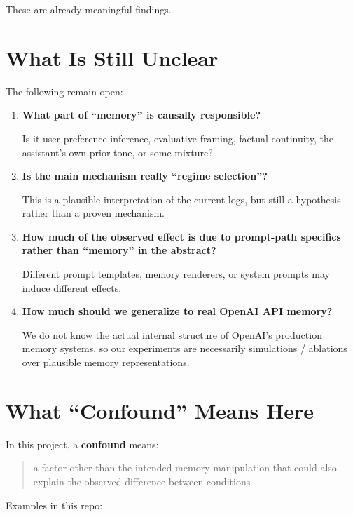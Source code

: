 \documentclass[11pt]{article}
\begin{document}
These are already meaningful findings.

\section{What Is Still Unclear}

The following remain open:

\begin{enumerate}
  \item \textbf{What part of ``memory'' is causally responsible?}

  Is it user preference inference, evaluative framing, factual continuity, the assistant's own prior tone, or some mixture?

  \item \textbf{Is the main mechanism really ``regime selection''?}

  This is a plausible interpretation of the current logs, but still a hypothesis rather than a proven mechanism.

  \item \textbf{How much of the observed effect is due to prompt-path specifics rather than ``memory'' in the abstract?}

  Different prompt templates, memory renderers, or system prompts may induce different effects.

  \item \textbf{How much should we generalize to real OpenAI API memory?}

  We do not know the actual internal structure of OpenAI's production memory systems, so our experiments are necessarily simulations / ablations over plausible memory representations.
\end{enumerate}

\section{What ``Confound'' Means Here}

In this project, a \textbf{confound} means:

\begin{quote}
a factor other than the intended memory manipulation that could also explain the observed difference between conditions
\end{quote}

Examples in this repo:
\end{document}
